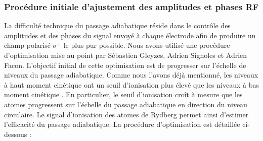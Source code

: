 \subsubsection*{Procédure initiale d'ajustement des amplitudes et phases RF}
\noindent La difficulté technique du passage adiabatique réside dans le contrôle des amplitudes et des phases du signal envoyé à chaque électrode afin de produire un champ polarisé $\sigma^+$ le plus pur possible.
Nous avons utilisé une procédure d'optimisation mise au point par Sébastien Gleyzes, Adrien Signoles et Adrien Facon.
L'objectif initial de cette optimisation est de progresser sur l'échelle de niveaux du passage adiabatique.
Comme nous l'avons déjà mentionné, les niveaux à haut moment cinétique ont un seuil d'ionisation plus élevé que les niveaux à bas moment cinétique \cite{TXT_GALLAGHER}.
En particulier, le seuil d'ionisation croît à mesure que les atomes progressent sur l'échelle du passage adiabatique en direction du niveau circulaire.
Le signal d'ionisation des atomes de Rydberg permet ainsi d'estimer l'efficacité du passage adiabatique.
%
La procédure d'optimisation est détaillée ci-dessous :
%
